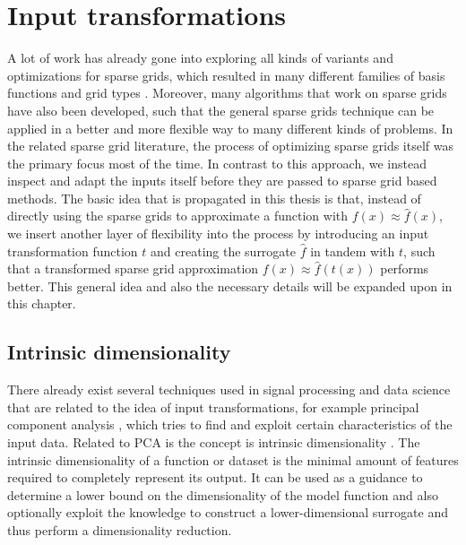 \documentclass[
  a4paper,  %
  twoside,  %
  bibliography=totoc,
  headsepline,
  cleardoublepage=empty,
  parskip=half,
  draft=false
]{scrbook}
\begin{document}
\chapter{Input transformations}
\label{chap:c3}

A lot of work has already gone into exploring all kinds of variants and optimizations for sparse grids, which resulted in many different families of basis functions and grid types \cite{Valentin2019, Feuersaenger2010}.
Moreover, many algorithms that work on sparse grids \cite{Gerstner1998, Garcke2001, Pflueger2010, Valentin2019, Rehme2021} have also been developed, such that the general sparse grids technique can be applied in a better and more flexible way to many different kinds of problems.
In the related sparse grid literature, the process of optimizing sparse grids itself was the primary focus most of the time.
In contrast to this approach, we instead inspect and adapt the inputs itself before they are passed to sparse grid based methods.
The basic idea that is propagated in this thesis is that, instead of directly using the sparse grids to approximate a function with $f(x) \approx \hat{f}(x)$, we insert another layer of flexibility into the process by introducing an input transformation function $t$ and creating the surrogate $\hat{f}$ in tandem with $t$, such that a transformed sparse grid approximation $f(x) \approx \hat{f}(t(x))$ performs better.
This general idea and also the necessary details will be expanded upon in this chapter.

\section{Intrinsic dimensionality}
\label{sec:intrinsic}

There already exist several techniques used in signal processing and data science that are related to the idea of input transformations, for example principal component analysis \cite{Abdi2010}, which tries to find and exploit certain characteristics of the input data.
Related to PCA is the concept is intrinsic dimensionality \cite{Bennett1969}.
The intrinsic dimensionality of a function or dataset is the minimal amount of features required to completely represent its output.
It can be used as a guidance to determine a lower bound on the dimensionality of the model function and also optionally exploit the knowledge to construct a lower-dimensional surrogate and thus perform a dimensionality reduction.
\end{document}
